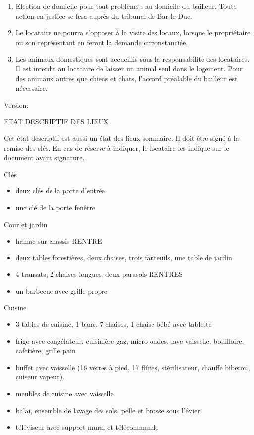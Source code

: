 \documentclass[a4paper,11pt]{article}
\begin{document}
\begin{enumerate}
\item Election de domicile pour tout problème : au domicile du bailleur. Toute action en justice se fera auprès du tribunal de Bar le Duc.

\item Le locataire ne pourra s’opposer à la visite des locaux, lorsque le propriétaire ou son représentant en feront la demande circonstanciée.

\item Les animaux domestiques sont accueillis sous la responsabilité des locataires. Il est interdit au locataire de laisser un animal seul dans le logement. Pour des animaux autres que chiens et chats, l'accord préalable du bailleur est nécessaire.

\end{enumerate}

\hspace{10cm}
Version: \date{\today}


\normalsize

\newpage{}

ETAT DESCRIPTIF DES LIEUX
 
Cet état descriptif est aussi un état des lieux sommaire. Il doit être signé à la remise des clés. En cas de réserve à indiquer, le locataire les indique sur le document avant signature.

\vspace{0.25cm}


Clés
\begin{itemize}
\item deux clés de la porte d'entrée
\item une clé de la porte fenêtre
\end{itemize}


\vspace{0.25cm}

Cour et jardin
\begin{itemize}
\item hamac sur chassis RENTRE
\item deux tables forestières, deux chaises, trois fauteuils, une table de jardin
\item 4 transats, 2 chaises longues, deux parasols RENTRES
\item un barbecue avec grille propre
\end{itemize}

\vspace{0.25cm}

Cuisine
\begin{itemize}
\item 3 tables de cuisine, 1 banc, 7 chaises, 1 chaise bébé avec tablette
\item frigo avec congélateur, cuisinière gaz, micro ondes, lave vaisselle, bouilloire, cafetière, grille pain
\item buffet avec vaisselle (16 verres à pied, 17 flûtes, stérilisateur, chauffe biberon, cuiseur vapeur).
\item meubles de cuisine avec vaisselle
\item balai, ensemble de lavage des sols, pelle et brosse sous l'évier
\item téléviseur avec support mural et télécommande
\end{itemize}
\end{document}
